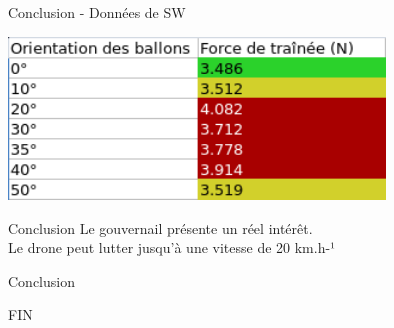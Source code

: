 \begin{frame}{Conclusion - Données de SW}
	\begin{center}
    \includegraphics[width=10cm]{../Images/resultatsSW.png} \\
	\end{center}
\end{frame}

\begin{frame}{Conclusion}
  Le gouvernail présente un réel intérêt.\\
  Le drone peut lutter jusqu'à une vitesse de 20 km.h-¹
\end{frame}

\begin{frame}{Conclusion}
  \begin{center}
  FIN
  \end{center}
\end{frame}


